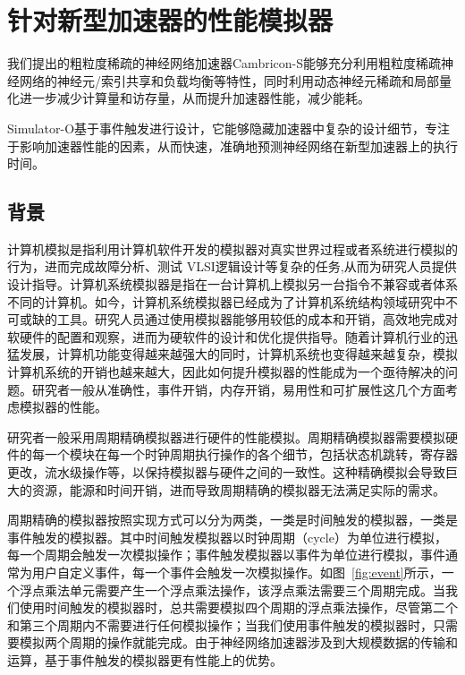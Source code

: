 \chapter{针对新型加速器的性能模拟器}

我们提出的粗粒度稀疏的神经网络加速器Cambricon-S能够充分利用粗粒度稀疏神经网络的神经元/索引共享和负载均衡等特性，同时利用动态神经元稀疏和局部量化进一步减少计算量和访存量，从而提升加速器性能，减少能耗。


Simulator-O基于事件触发进行设计，它能够隐藏加速器中复杂的设计细节，专注于影响加速器性能的因素，从而快速，准确地预测神经网络在新型加速器上的执行时间。


\section{背景}
计算机模拟是指利用计算机软件开发的模拟器对真实世界过程或者系统进行模拟的行为，进而完成故障分析、测试 VLSI逻辑设计等复杂的任务,从而为研究人员提供设计指导。计算机系统模拟器是指在一台计算机上模拟另一台指令不兼容或者体系不同的计算机。如今，计算机系统模拟器已经成为了计算机系统结构领域研究中不可或缺的工具。研究人员通过使用模拟器能够用较低的成本和开销，高效地完成对软硬件的配置和观察，进而为硬软件的设计和优化提供指导。随着计算机行业的迅猛发展，计算机功能变得越来越强大的同时，计算机系统也变得越来越复杂，模拟计算机系统的开销也越来越大，因此如何提升模拟器的性能成为一个亟待解决的问题。研究者一般从准确性，事件开销，内存开销，易用性和可扩展性这几个方面考虑模拟器的性能。

研究者一般采用周期精确模拟器进行硬件的性能模拟。周期精确模拟器需要模拟硬件的每一个模块在每一个时钟周期执行操作的各个细节，包括状态机跳转，寄存器更改，流水级操作等，以保持模拟器与硬件之间的一致性。这种精确模拟会导致巨大的资源，能源和时间开销，进而导致周期精确的模拟器无法满足实际的需求。

周期精确的模拟器按照实现方式可以分为两类，一类是时间触发的模拟器，一类是事件触发的模拟器。其中时间触发模拟器以时钟周期（cycle）为单位进行模拟，每一个周期会触发一次模拟操作；事件触发模拟器以事件为单位进行模拟，事件通常为用户自定义事件，每一个事件会触发一次模拟操作。如图~\ref{fig:event}所示，一个浮点乘法单元需要产生一个浮点乘法操作，该浮点乘法需要三个周期完成。当我们使用时间触发的模拟器时，总共需要模拟四个周期的浮点乘法操作，尽管第二个和第三个周期内不需要进行任何模拟操作；当我们使用事件触发的模拟器时，只需要模拟两个周期的操作就能完成。由于神经网络加速器涉及到大规模数据的传输和运算，基于事件触发的模拟器更有性能上的优势。

